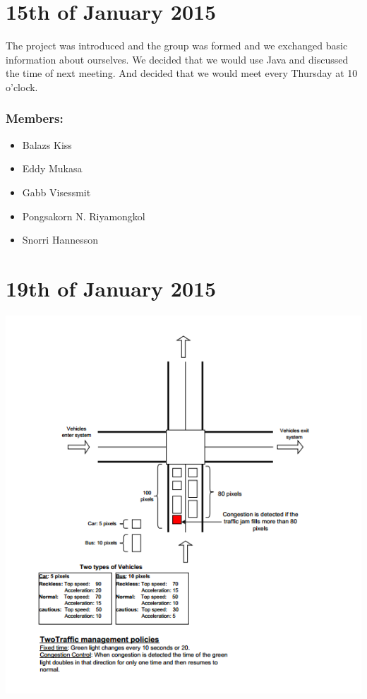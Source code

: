 \documentclass[11pt]{article}
\begin{document}
\section{15th of January 2015}
The project was introduced and the group was formed and we exchanged basic information about ourselves. We decided that we would use Java and discussed the time of next meeting. And decided that we would meet every Thursday at 10 o'clock.
\subsubsection{Members:}
\begin{itemize}
\item Balazs Kiss
\item Eddy Mukasa
\item Gabb Visessmit
\item Pongsakorn N. Riyamongkol
\item Snorri Hannesson
\end{itemize}
\newpage

\section{19th of January 2015}
\includegraphics{meeting2}
\newpage
\end{document}
